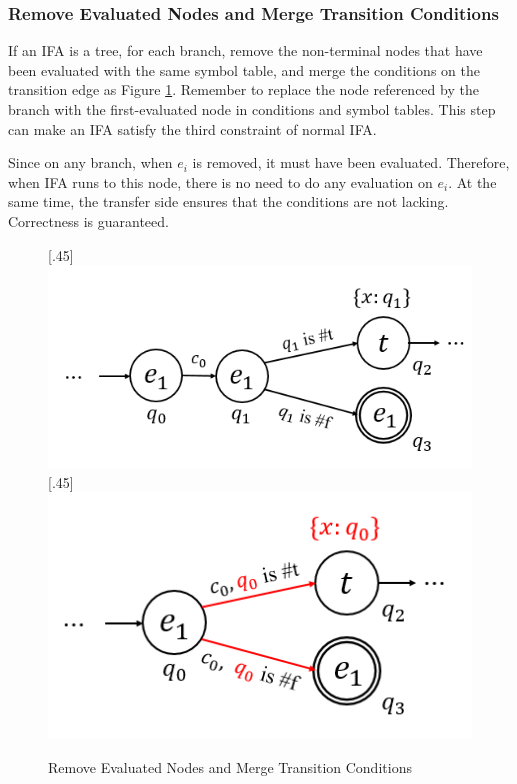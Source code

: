\subsubsection{Remove Evaluated Nodes and Merge Transition Conditions}

If an IFA is a tree, for each branch, remove the non-terminal nodes that have been evaluated with the same symbol table, and merge the conditions on the transition edge as Figure \ref{fig:nmlifa-merge}. Remember to replace the node referenced by the branch with the first-evaluated node in conditions and symbol tables. This step can make an IFA satisfy the third constraint of normal IFA.

Since on any branch, when $e_i$ is removed, it must have been evaluated. Therefore, when IFA runs to this node, there is no need to do any evaluation on $e_i$. At the same time, the transfer side ensures that the conditions are not lacking. Correctness is guaranteed.

\begin{figure}[t]
\centering
{}[.45\linewidth]{
    \includegraphics[scale=0.25]{images/nmlifa/nmlifa-merge-1.png}
}
[.45\linewidth]{
    \includegraphics[scale=0.25]{images/nmlifa/nmlifa-merge-2.png}
}
\caption{Remove Evaluated Nodes and Merge Transition Conditions}
\label{fig:nmlifa-merge}
\end{figure}

